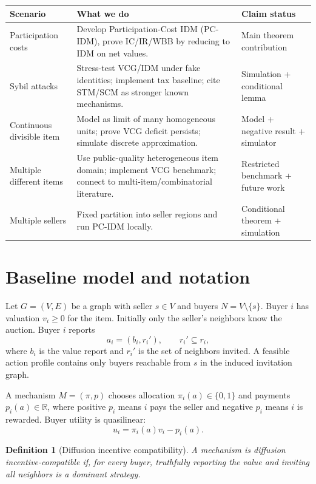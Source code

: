 \documentclass[11pt]{article}
\newtheorem{definition}{Definition}
\newcommand{\R}{\mathbb{R}}
\begin{document}
\begin{center}
\begin{tabularx}{0.96\textwidth}{p{}X p{}}
\toprule
\textbf{Scenario} & \textbf{What we do} & \textbf{Claim status}\\
\midrule
Participation costs & Develop Participation-Cost IDM (PC-IDM), prove IC/IR/WBB by reducing to IDM on net values. & Main theorem contribution\\
Sybil attacks & Stress-test VCG/IDM under fake identities; implement tax baseline; cite STM/SCM as stronger known mechanisms. & Simulation + conditional lemma\\
Continuous divisible item & Model as limit of many homogeneous units; prove VCG deficit persists; simulate discrete approximation. & Model + negative result + simulator\\
Multiple different items & Use public-quality heterogeneous item domain; implement VCG benchmark; connect to multi-item/combinatorial literature. & Restricted benchmark + future work\\
Multiple sellers & Fixed partition into seller regions and run PC-IDM locally. & Conditional theorem + simulation\\
\bottomrule
\end{tabularx}
\end{center}

\section{Baseline model and notation}

Let $G=(V,E)$ be a graph with seller $s\in V$ and buyers $N=V\setminus\{s\}$.  Buyer $i$ has valuation $v_i\ge 0$ for the item.  Initially only the seller's neighbors know the auction.  Buyer $i$ reports
\[
    a_i=(b_i,r_i'),\qquad r_i'\subseteq r_i,
\]
where $b_i$ is the value report and $r_i'$ is the set of neighbors invited.  A feasible action profile contains only buyers reachable from $s$ in the induced invitation graph.

A mechanism $M=(\pi,p)$ chooses allocation $\pi_i(a)\in\{0,1\}$ and payments $p_i(a)\in\R$, where positive $p_i$ means $i$ pays the seller and negative $p_i$ means $i$ is rewarded.  Buyer utility is quasilinear:
\[
    u_i = \pi_i(a)v_i - p_i(a).
\]

\begin{definition}[Diffusion incentive compatibility]
A mechanism is diffusion incentive-compatible if, for every buyer, truthfully reporting the value and inviting all neighbors is a dominant strategy.
\end{definition}
\end{document}
